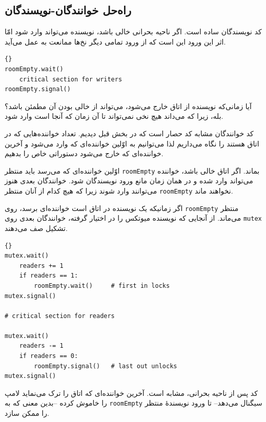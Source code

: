 \documentclass{book}
\begin{document}
\subsection{راه‌حل خوانندگان-نویسندگان}

    کد نویسندگان ساده است. اگر ناحیه بحرانی خالی باشد، نویسنده می‌تواند وارد شود امّا  اثر این ورود این است که از ورود تمامی دیگر نخ‌ها ممانعت 
    به عمل می‌آید. 

\begin{latin}
\begin{lstlisting}[title=\rl{ راه‌حل  نویسندگان}]{}
roomEmpty.wait()
    critical section for writers
roomEmpty.signal()
\end{lstlisting}
\end{latin}

    آیا زمانی‌که نویسنده از اتاق خارج می‌شود، می‌تواند از خالی بودن آن مطمئن باشد؟
    بله، زیرا که می‌داند هیچ نخی نمی‌تواند تا آن زمان که آنجا است وارد شود. 

    کد خوانندگان مشابه کد حصار است که در بخش قبل دیدیم. تعداد خواننده‌هایی که در اتاق هستند را نگاه می‌داریم لذا می‌توانیم به 
    اوّلین خواننده‌ای که وارد می‌شود و آخرین خواننده‌ای که خارج می‌شود دستوراتی خاص را بدهیم. 

    اوّلین خواننده‌ای که می‌رسد باید منتظر  {\tt roomEmpty} بماند. اگر اتاق خالی باشد،‌ خواننده می‌تواند وارد شده و در همان زمان 
    مانع ورود نویسندگان شود. خوانندگان بعدی هنوز می‌توانند وارد شوند زیرا که هیچ کدام از آنان منتظر  {\tt roomEmpty} نخواهند ماند. 

    اگر زمانیکه یک نویسنده در اتاق است خواننده‌ای برسد، روی {\tt roomEmpty} منتظر می‌ماند. از آنجایی که نویسنده 
    میوتکس را در اختیار گرفته، خوانندگان بعدی روی  {\tt mutex} تشکیل صف می‌دهند. 
\begin{latin}
\begin{lstlisting}[title=\rl{راه‌حل خوانندگان}]{}
mutex.wait()
    readers += 1
    if readers == 1:
        roomEmpty.wait()     # first in locks
mutex.signal()

# critical section for readers

mutex.wait()
    readers -= 1
    if readers == 0:
        roomEmpty.signal()   # last out unlocks
mutex.signal()
\end{lstlisting}
\end{latin}

    کد پس از ناحیه بحرانی، مشابه است. آخرین خواننده‌ای که اتاق را ترک می‌نماید لامپ را خاموش کرده --بدین معنی که به {\tt roomEmpty}
    سیگنال می‌دهد-- تا ورود نویسندهٔ منتظر را ممکن سازد. 
\end{document}
